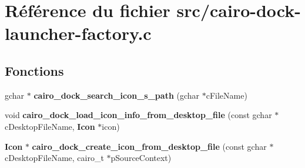 \section{R\'{e}f\'{e}rence du fichier src/cairo-dock-launcher-factory.c}
\label{cairo-dock-launcher-factory_8c}
\subsection*{Fonctions}
\begin{CompactItemize}
\item 
gchar $\ast$ {\bf cairo\_\-dock\_\-search\_\-icon\_\-s\_\-path} (gchar $\ast$c\-File\-Name)
\item 
void {\bf cairo\_\-dock\_\-load\_\-icon\_\-info\_\-from\_\-desktop\_\-file} (const gchar $\ast$c\-Desktop\-File\-Name, {\bf Icon} $\ast$icon)
\item 
{\bf Icon} $\ast$ {\bf cairo\_\-dock\_\-create\_\-icon\_\-from\_\-desktop\_\-file} (const gchar $\ast$c\-Desktop\-File\-Name, cairo\_\-t $\ast$p\-Source\-Context)
\end{CompactItemize}
